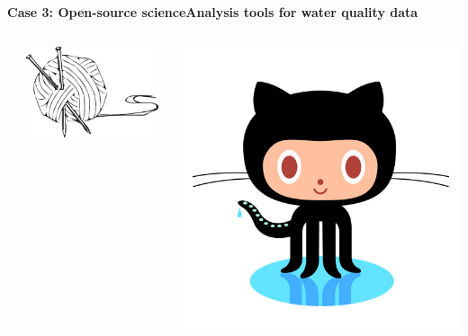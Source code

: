 \documentclass[serif]{beamer}\usepackage[]{graphicx}\usepackage[]{color}
\begin{document}
\begin{frame}{\textbf{Case 3: Open-source science}}{\textbf{Analysis tools for water quality data}}
\begin{columns}
\begin{column}{0.25\textwidth}
\end{column}
\begin{column}{0.25\textwidth}
\centerline{\includegraphics[width = \textwidth]{fig/knit-logo.png}}
\end{column}
\begin{column}{0.25\textwidth}
\centerline{\includegraphics[width = \textwidth]{fig/octocat.png}}
\end{column}
\end{columns}
\end{frame}
\end{document}
